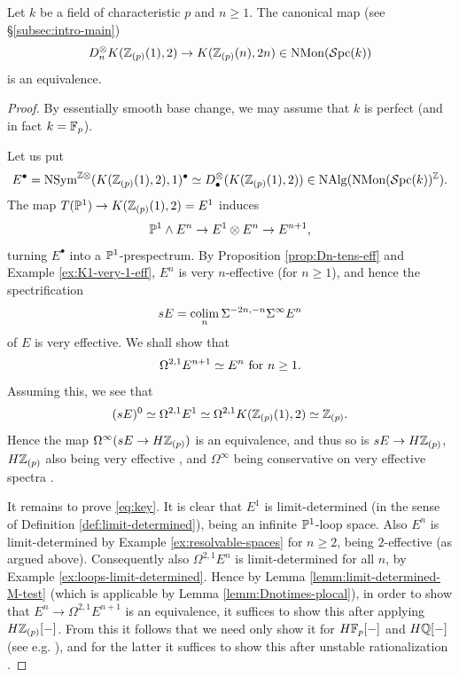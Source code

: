 \documentclass{amsart}
\numberwithin{proposition}{section}
\numberwithin{equation}{section}
\def\NSym{\mathrm{NSym}}
\def\NMon{\mathrm{NMon}}
\begin{document}
\begin{theorem} \label{thm:mainmain}
Let $k$ be a field of characteristic $p$ and $n \ge 1$.
The canonical map (see \S\ref{subsec:intro-main}) \[ D_n^{\otimes} K(\Z_{(p)}(1), 2) \to K(\Z_{(p)}(n),2n) \in \NMon(\Spc(k)) \] is an equivalence.
\end{theorem}
\begin{proof}
By essentially smooth base change, we may assume that $k$ is perfect (and in fact $k=\F_p$).

Let us put \[ E^\bullet = \NSym^{\Z\otimes}(K(\Z_{(p)}(1),2),1)^\bullet \wequi D_\bullet^\otimes(K(\Z_{(p)}(1),2)) \in \NAlg(\NMon(\Spc(k))^\Z). \]
The map $T(\P^1) \to K(\Z_{(p)}(1), 2) = E^1$ induces \[ \P^1 \wedge E^n \to E^1 \otimes E^n \to E^{n+1}, \] turning $E^\bullet$ into a $\P^1$-prespectrum.
By Proposition \ref{prop:Dn-tens-eff} and Example \ref{ex:K1-very-1-eff}, $E^n$ is very $n$-effective (for $n \ge 1$), and hence the spectrification \[ sE = \colim_n \Sigma^{-2n,-n} \Sigma^\infty E^n \] of $E$ is very effective.
We shall show that \begin{equation} \label{eq:key} \Omega^{2,1}E^{n+1} \wequi E^n \text{ for } n \ge 1. \end{equation}
Assuming this, we see that \[ (sE)^0 \wequi \Omega^{2,1} E^1 \wequi \Omega^{2,1} K(\Z_{(p)}(1),2) \wequi \Z_{(p)}. \]
Hence the map $\Omega^\infty(sE \to H\Z_{(p)})$ is an equivalence, and thus so is $sE \to H\Z_{(p)}$, $H\Z_{(p)}$ also being very effective \cite[Lemma~13.7]{bachmann-norms}, and $\Omega^\infty$ being conservative on very effective spectra \cite[Corollary~3.5.15]{EHKSY}.

It remains to prove \eqref{eq:key}.
It is clear that $E^1$ is limit-determined (in the sense of Definition \ref{def:limit-determined}), being an infinite $\P^1$-loop space.
Also $E^n$ is limit-determined by Example \ref{ex:resolvable-spaces} for $n \ge 2$, being $2$-effective (as argued above).
Consequently also $\Omega^{2,1}E^n$ is limit-determined for all $n$, by Example \ref{ex:loops-limit-determined}.
Hence by Lemma \ref{lemm:limit-determined-M-test} (which is applicable by Lemma \ref{lemm:Dnotimes-plocal}), in order to show that $E^n \to \Omega^{2,1}E^{n+1}$ is an equivalence, it suffices to show this after applying $H\Z_{(p)}[\ph]$.
From this it follows that we need only show it for $H\F_p[\ph]$ and $H\Q[\ph]$ (see e.g. \cite[Lemma~2.16]{bachmann-eta}), and for the latter it suffices to show this after unstable rationalization \cite[Theorem~4.3.9(2)]{AFHLocalization}.


\end{proof}
\end{document}
